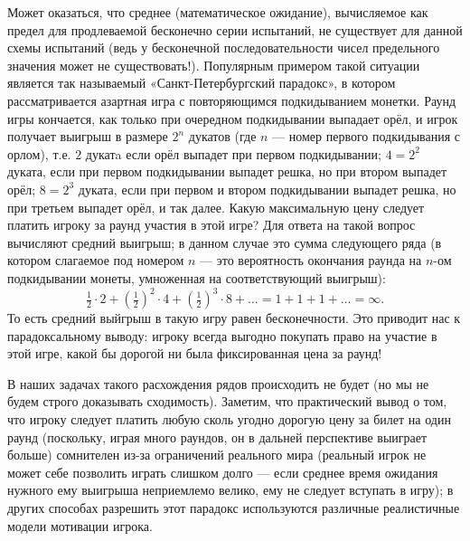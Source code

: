 \documentclass{article}
\begin{document}
Может оказаться, что среднее (математическое ожидание), вычисляемое как предел для продлеваемой бесконечно серии испытаний, не существует для данной схемы испытаний (ведь у бесконечной последовательности чисел предельного значения может не существовать!). Популярным примером такой ситуации является так называемый «Санкт-Петербургский парадокс», в котором рассматривается азартная игра с повторяющимся подкидыванием монетки. 
Раунд игры кончается, как только при очередном подкидывании выпадает орёл, и игрок получает выигрыш в размере $2^n$ дукатов 
(где $n$ --- номер первого подкидывания с орлом), 
т.е. $2$ дукатa если орёл выпадет при первом подкидывании; 
$4=2^2$ дуката, если при первом подкидывании выпадет решка, но при втором выпадет орёл; 
$8=2^3$ дуката, 
если при первом и втором подкидывании выпадет решка, 
но при третьем выпадет орёл, 
и так далее. 
Какую максимальную цену следует платить игроку за раунд участия в этой игре? 
Для ответа на такой вопрос вычисляют средний выигрыш; 
в данном случае это сумма следующего ряда 
(в котором слагаемое под номером $n$ --- это вероятность окончания раунда на $n$-ом подкидывании монеты, умноженная на соответствующий выигрыш):
\[\tfrac12\cdot2+(\tfrac12)^2\cdot4+(\tfrac12)^3\cdot8+\dots=1+1+1+\dots=\infty.\]
То есть средний выйгрыш в такую игру равен бесконечности.
Это приводит нас к парадоксальному выводу: игроку всегда выгодно покупать право на участие в этой игре, какой бы дорогой ни была фиксированная цена за раунд!

В наших задачах такого расхождения рядов происходить не будет (но мы не будем строго доказывать сходимость). Заметим, что практический вывод о том, что игроку следует платить любую сколь угодно дорогую цену за билет на один раунд (поскольку, играя много раундов, он в дальней перспективе выиграет больше) сомнителен из-за ограничений реального мира (реальный игрок не может себе позволить играть слишком долго --- если среднее время ожидания нужного ему выигрыша неприемлемо велико, ему не следует вступать в игру); в других способах разрешить этот парадокс используются различные реалистичные модели мотивации игрока.
\end{document}
